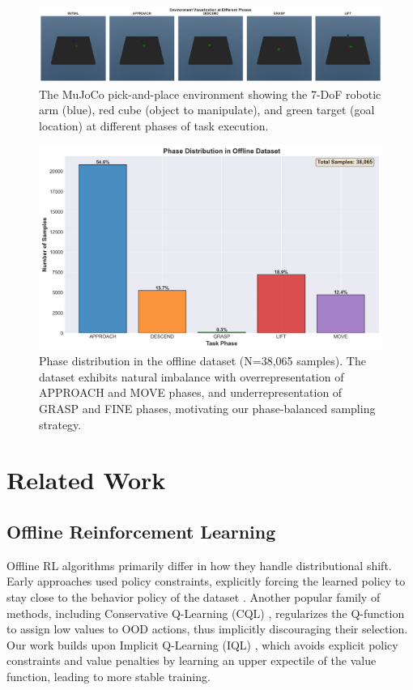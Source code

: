 \documentclass[conference]{IEEEtran}
\begin{document}
\begin{figure}[t]
\centering
\includegraphics[width=\columnwidth]{environment_screenshots.png}
\caption{The MuJoCo pick-and-place environment showing the 7-DoF robotic arm (blue), red cube (object to manipulate), and green target (goal location) at different phases of task execution.}
\label{fig:environment}
\end{figure}

\begin{figure}[t]
\centering
\includegraphics[width=\columnwidth]{phase_distribution.png}
\caption{Phase distribution in the offline dataset (N=38,065 samples). The dataset exhibits natural imbalance with overrepresentation of APPROACH and MOVE phases, and underrepresentation of GRASP and FINE phases, motivating our phase-balanced sampling strategy.}
\label{fig:phase_dist}
\end{figure}

\section{Related Work}

\subsection{Offline Reinforcement Learning}
Offline RL algorithms primarily differ in how they handle distributional shift. Early approaches used policy constraints, explicitly forcing the learned policy to stay close to the behavior policy of the dataset \cite{td3_bc, bear}. Another popular family of methods, including Conservative Q-Learning (CQL) \cite{cql}, regularizes the Q-function to assign low values to OOD actions, thus implicitly discouraging their selection. Our work builds upon Implicit Q-Learning (IQL) \cite{iql}, which avoids explicit policy constraints and value penalties by learning an upper expectile of the value function, leading to more stable training.
\end{document}
